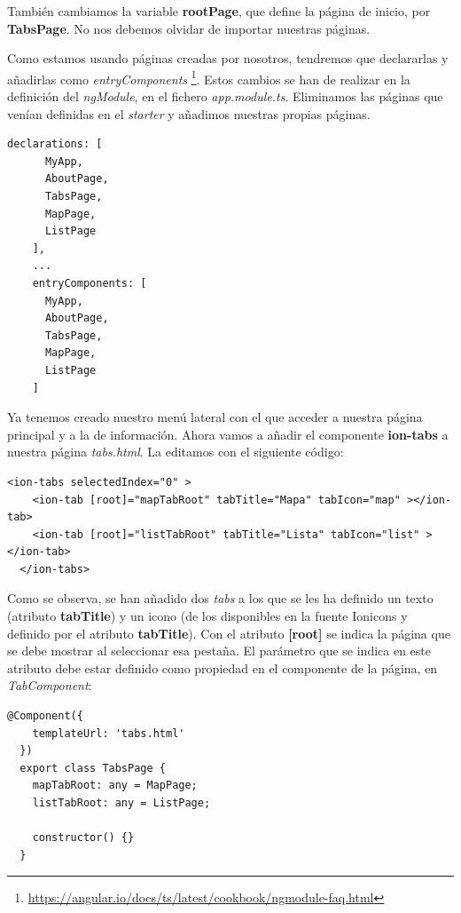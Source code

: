 También cambiamos la variable \textbf{rootPage}, que define la página de inicio, por \textbf{TabsPage}. No nos debemos olvidar de importar nuestras páginas.

Como estamos usando páginas creadas por nosotros, tendremos que declararlas y añadirlas como \emph{entryComponents} \footnote{\url{https://angular.io/docs/ts/latest/cookbook/ngmodule-faq.html}}. Estos cambios se han de realizar en la definición del \emph{ngModule}, en el fichero \emph{app.module.ts}. Eliminamos las páginas que venían definidas en el \emph{starter} y añadimos nuestras  propias páginas.

\begin{lstlisting}[style=htmlcssjs,frame=tlrb,xleftmargin={0.2cm}]
  declarations: [
      MyApp,
      AboutPage,
      TabsPage,
      MapPage,
      ListPage
    ],
    ...
    entryComponents: [
      MyApp,
      AboutPage,
      TabsPage,
      MapPage,
      ListPage
    ]
\end{lstlisting}

Ya tenemos creado nuestro menú lateral con el que acceder a nuestra página principal y a la de información. Ahora vamos a añadir el componente \textbf{ion-tabs} a nuestra página \emph{tabs.html}. La editamos con el siguiente código:

\begin{lstlisting}[style=htmlcssjs,frame=tlrb,xleftmargin={0.2cm}]
  <ion-tabs selectedIndex="0" >
    <ion-tab [root]="mapTabRoot" tabTitle="Mapa" tabIcon="map" ></ion-tab>
    <ion-tab [root]="listTabRoot" tabTitle="Lista" tabIcon="list" ></ion-tab>
  </ion-tabs>
\end{lstlisting}

Como se observa, se han añadido dos \emph{tabs} a los que se les ha definido un texto (atributo \textbf{tabTitle}) y un icono (de los disponibles en la fuente Ionicons y definido por el atributo \textbf{tabTitle}). Con el atributo \textbf{[root]} se indica la página que se debe mostrar al seleccionar esa pestaña. El parámetro que se indica en este atributo debe estar definido como propiedad en el componente de la página, en \emph{TabComponent}:

\begin{lstlisting}[style=htmlcssjs,frame=tlrb,xleftmargin={0.2cm}]
  @Component({
    templateUrl: 'tabs.html'
  })
  export class TabsPage {
    mapTabRoot: any = MapPage;
    listTabRoot: any = ListPage;

    constructor() {}
  }
\end{lstlisting}

